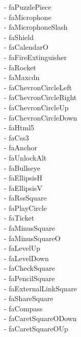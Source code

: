 \documentclass[%
               doublesided,
               paper=a4,
               fontsize=10pt
              ]{my-resume}
\begin{document}
\faPuzzlePiece - faPuzzlePiece\\ \faMicrophone - faMicrophone\\ \faMicrophoneSlash - faMicrophoneSlash\\ \faShield - faShield\\ \faCalendarO - faCalendarO\\ \faFireExtinguisher - faFireExtinguisher\\ \faRocket - faRocket\\ \faMaxcdn - faMaxcdn\\ \faChevronCircleLeft - faChevronCircleLeft\\ \faChevronCircleRight - faChevronCircleRight\\ \faChevronCircleUp - faChevronCircleUp\\ \faChevronCircleDown - faChevronCircleDown\\  - faHtml5\\  - faCss3\\ \faAnchor - faAnchor\\ \faUnlockAlt - faUnlockAlt\\ \faBullseye - faBullseye\\ \faEllipsisH - faEllipsisH\\ \faEllipsisV - faEllipsisV\\ \faRssSquare - faRssSquare\\ \faPlayCircle - faPlayCircle\\ \faTicket - faTicket\\ \faMinusSquare - faMinusSquare\\ \faMinusSquareO - faMinusSquareO\\ \faLevelUp - faLevelUp\\ \faLevelDown - faLevelDown\\ \faCheckSquare - faCheckSquare\\ \faPencilSquare - faPencilSquare\\ \faExternalLinkSquare - faExternalLinkSquare\\ \faShareSquare - faShareSquare\\ \faCompass - faCompass\\ \faCaretSquareODown - faCaretSquareODown\\ \faCaretSquareOUp - faCaretSquareOUp\\ 
\end{document}
